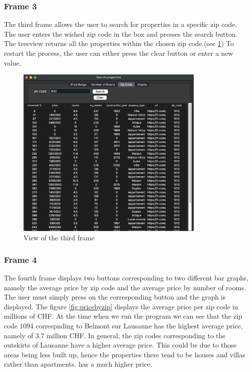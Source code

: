 \documentclass[main]{subfiles}
\begin{document}
\subsubsection{Frame 3}
The third frame allows the user to search for properties in a specific zip code. 
The user enters the wished zip code in the box and presses the search button. 
The treeview returns all the properties within the chosen zip code.(see \ref{fig:frame3})
To restart the process, the user can either press the clear button or enter a new value.

\begin{figure}[htbp]
    \centerline{
        \includegraphics[width = 92mm]{prog_10.png}}
    \caption{View of the third frame}
    \label{fig:frame3}
\end{figure}

\subsubsection{Frame 4}
The fourth frame displays two buttons corresponding to two different bar graphs, 
namely the average price by zip code and the average price by number of rooms.
The user must simply press on the corresponding button and the graph is displayed. 
The figure \ref{fig:pricebyzip} displays the average price per zip code in millions of CHF. 
At the time when we run the program we can see that the zip code 1094 correspnding to Belmont sur Lausanne has the highest average price, namely of $3.7$ million CHF.
In general, the zip codes corresponding to the outskirts of Lausanne have a higher average price. 
This could be due to those areas being less built up, hence the properties there tend to be houses and villas rather than apartments. 
has a much higher price. 
\end{document}
